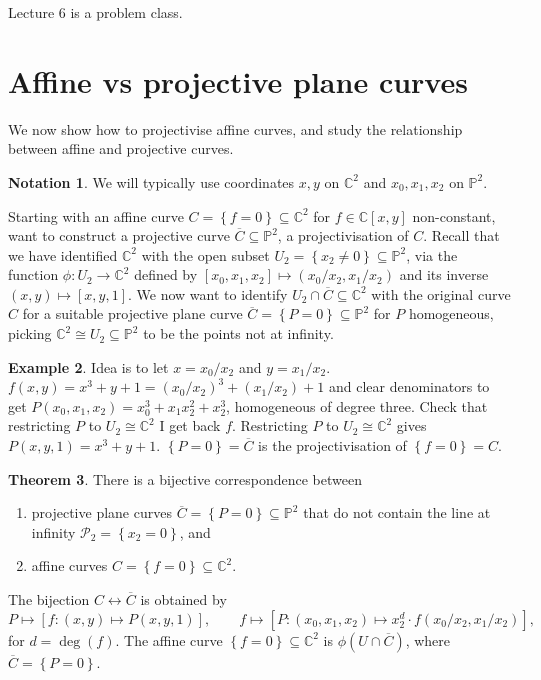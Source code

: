\documentclass{article}
\newcommand{\C}{\mathbb{C}}
\renewcommand{\P}{\mathbb{P}}
\newcommand{\rb}[1]{\left( #1 \right)}
\renewcommand{\sb}[1]{\left[ #1 \right]}
\newcommand{\cb}[1]{\left\{ #1 \right\}}
\theoremstyle{definition}\newtheorem{definition}{Definition}[section]
\theoremstyle{definition}\newtheorem{notation}[definition]{Notation}
\theoremstyle{definition}\newtheorem{remark}[definition]{Remark}
\theoremstyle{definition}\newtheorem{example}[definition]{Example}
\theoremstyle{definition}\newtheorem{fact}{Fact}
\theoremstyle{definition}\newtheorem{exercise}{Exercise}
\newtheorem{theorem}[definition]{Theorem}
\begin{document}

Lecture 6 is a problem class.

\section{Affine vs projective plane curves}

We now show how to projectivise affine curves, and study the relationship between affine and projective curves.

\begin{notation}
We will typically use coordinates $ x, y $ on $ \C^2 $ and $ x_0, x_1, x_2 $ on $ \P^2 $.
\end{notation}

Starting with an affine curve $ C = \cb{f = 0} \subseteq \C^2 $ for $ f \in \C\sb{x, y} $ non-constant, want to construct a projective curve $ \overline{C} \subseteq \P^2 $, a projectivisation of $ C $. Recall that we have identified $ \C^2 $ with the open subset $ U_2 = \cb{x_2 \ne 0} \subseteq \P^2 $, via the function $ \phi : U_2 \to \C^2 $ defined by $ \sb{x_0, x_1, x_2} \mapsto \rb{x_0 / x_2, x_1 / x_2} $ and its inverse $ \rb{x, y} \mapsto \sb{x, y, 1} $. We now want to identify $ U_2 \cap \overline{C} \subseteq \C^2 $ with the original curve $ C $ for a suitable projective plane curve $ \overline{C} = \cb{P = 0} \subseteq \P^2 $ for $ P $ homogeneous, picking $ \C^2 \cong U_2 \subseteq \P^2 $ to be the points not at infinity.

\begin{example}
Idea is to let $ x = x_0 / x_2 $ and $ y = x_1 / x_2 $. $ f\rb{x, y} = x^3 + y + 1 = \rb{x_0 / x_2}^3 + \rb{x_1 / x_2} + 1 $ and clear denominators to get $ P\rb{x_0, x_1, x_2} = x_0^3 + x_1x_2^2 + x_2^3 $, homogeneous of degree three. Check that restricting $ P $ to $ U_2 \cong \C^2 $ I get back $ f $. Restricting $ P $ to $ U_2 \cong \C^2 $ gives $ P\rb{x, y, 1} = x^3 + y + 1 $. $ \cb{P = 0} = \overline{C} $ is the projectivisation of $ \cb{f = 0} = C $.
\end{example}

\begin{theorem}
There is a bijective correspondence between
\begin{enumerate}
\item projective plane curves $ \overline{C} = \cb{P = 0} \subseteq \P^2 $ that do not contain the line at infinity $ \mathcal{P}_2 = \cb{x_2 = 0} $, and
\item affine curves $ C = \cb{f = 0} \subseteq \C^2 $.
\end{enumerate}
The bijection $ C \leftrightarrow \overline{C} $ is obtained by
$$ P \mapsto \sb{f : \rb{x, y} \mapsto P\rb{x, y, 1}}, \qquad f \mapsto \sb{P : \rb{x_0, x_1, x_2} \mapsto x_2^d \cdot f\rb{x_0 / x_2, x_1 / x_2}}, $$
for $ d = \deg\rb{f} $. The affine curve $ \cb{f = 0} \subseteq \C^2 $ is $ \phi\rb{U \cap \overline{C}} $, where $ \overline{C} = \cb{P = 0} $.
\end{theorem}
\end{document}
